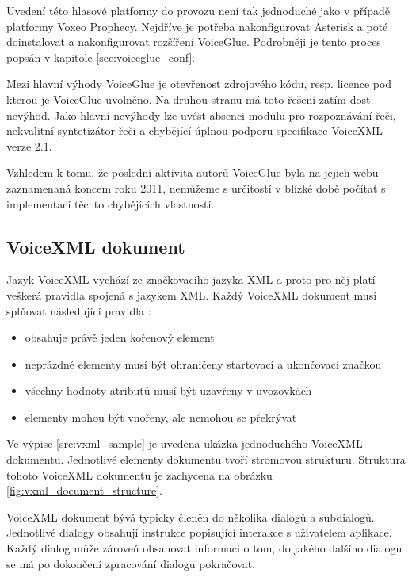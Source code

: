 \documentclass[ing,male,java,dept460,twoside]{diploma}						%
\begin{document}
Uvedení této hlasové platformy do provozu není tak jednoduché jako v případě platformy Voxeo Prophecy. Nejdříve je potřeba nakonfigurovat Asterisk a poté doinstalovat a nakonfigurovat rozšíření VoiceGlue. Podrobněji je tento proces popsán v kapitole \ref{sec:voiceglue_conf}.

Mezi hlavní výhody VoiceGlue je otevřenost zdrojového kódu, resp. licence pod kterou je VoiceGlue uvolněno. Na druhou stranu má toto řešení zatím dost nevýhod. Jako hlavní nevýhody lze uvést absenci modulu pro rozpoznávání řeči, nekvalitní syntetizátor řeči a chybějící úplnou podporu specifikace VoiceXML verze 2.1.

Vzhledem k tomu, že poslední aktivita autorů VoiceGlue byla na jejich webu zaznamenaná koncem roku 2011, nemůžeme s určitostí v blízké době počítat s implementací těchto chybějících vlastností.

\subsection{VoiceXML dokument}
\label{sec:VXML_dokument}
Jazyk VoiceXML vychází ze značkovacího jazyka XML a proto pro něj platí veškerá pravidla spojená s jazykem XML. Každý VoiceXML dokument musí splňovat následující pravidla \cite{xml_wiki}:

\begin{itemize}
\item obsahuje právě jeden kořenový element
\item neprázdné elementy musí být ohraničeny startovací a ukončovací značkou
\item všechny hodnoty atributů musí být uzavřeny v uvozovkách
\item elementy mohou být vnořeny, ale nemohou se překrývat
\end{itemize}


Ve výpise \ref{src:vxml_sample} je uvedena ukázka jednoduchého VoiceXML dokumentu. Jednotlivé elementy dokumentu tvoří stromovou strukturu. Struktura tohoto VoiceXML dokumentu je zachycena na obrázku \ref{fig:vxml_document_structure}.

VoiceXML dokument bývá typicky členěn do několika dialogů a subdialogů. Jednotlivé dialogy obsahují instrukce popisující interakce s uživatelem aplikace. Každý dialog může zároveň obsahovat informaci o tom, do jakého dalšího dialogu se má po dokončení zpracování dialogu pokračovat.
\end{document}
